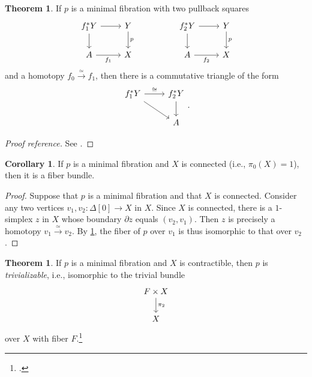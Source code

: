 \documentclass[10pt,letterpaper,cm]{nupset}
\theoremstyle{definition}
\theoremstyle{theorem}
\newtheorem{theorem}[definition]{Theorem}
\newtheorem{corollary}[definition]{Corollary}
\theoremstyle{remark}
\newcommand{\0}{\mathbf{0}}
\newcommand{\1}{\mathbf{1}}
\newcommand{\2}{\mathbf{2}}
\begin{document}
\begin{theorem}\label{minisopull}
If $p$ is a minimal fibration  with two pullback squares
\[
\begin{tikzcd}
f_1^{\ast}{Y} \arrow[d] \arrow[r] & Y \arrow[d, "p"] &  & f_2^{\ast}{Y} \arrow[d] \arrow[r] & Y \arrow[d, "p"] \\
A \arrow[r, "f_1"']            & X                &  & A \arrow[r, "f_2"']            & X               
\end{tikzcd}
\] and a homotopy $f_0\overset{\simeq}{\longrightarrow} f_1$, then there is a commutative triangle of the form
\[
\begin{tikzcd}
f_1^{\ast}{Y} \arrow[r, "\cong"] \arrow[rd] & f_2^{\ast}{Y} \arrow[d] \\
                                            & A                      
\end{tikzcd}
.
\]
\end{theorem}
\begin{proof}[Proof reference]
See \cite[Corollary 10.7]{goerss}.
\end{proof}

\begin{corollary}
If $p$ is a minimal fibration and $X$ is connected (i.e., $\pi_0(X)=1$),  then it is a fiber bundle.
\end{corollary}
\begin{proof}
Suppose that $p$ is a minimal fibration and that $X$ is connected. Consider any two vertices $v_1, v_2 : \Delta[0] \to X$ in $X$. Since $X$ is connected, there is a $1$-simplex $z$ in $X$ whose boundary $\partial{z}$ equals $\left(v_2,v_1\right)$. Then $z$ is precisely a homotopy $v_1 \overset{\simeq}{\longrightarrow} v_2.$ By \cref{minisopull}, the fiber of $p$ over $v_1$ is thus isomorphic to that over $v_2$.
\end{proof}

\begin{theorem}\label{trivifibbund}
If $p$ is a minimal fibration and $X$ is contractible, then $p$ is \textit{trivializable}, i.e., isomorphic to the trivial bundle 
\[
\begin{tikzcd}
F\times X \arrow[d, "\pi_2"] \\
X                           
\end{tikzcd}
\] over $X$ with fiber $F$.\footnote{\cite[Corollary III.5.6]{Barr}.}
\end{theorem}
\end{document}
